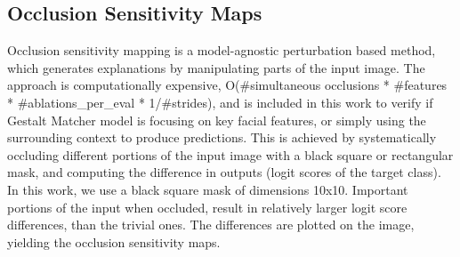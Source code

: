 \documentclass[../report.tex]{subfiles}
\begin{document}
    \subsection{Occlusion Sensitivity Maps}
    Occlusion sensitivity mapping \cite{matthew2014visualizing} is a model-agnostic perturbation based method, which generates explanations by manipulating parts of the input image. The approach is computationally expensive, O(\#simultaneous occlusions * \#features * \#ablations\_per\_eval * 1/\#strides), and is included in this work to verify if Gestalt Matcher model is focusing on key facial features, or simply using the surrounding context to produce predictions. This is achieved by systematically occluding different portions of the input image with a black square or rectangular mask, and computing the difference in outputs (logit scores of the target class). In this work, we use a  black square mask of dimensions 10x10. Important portions of the input when occluded, result in relatively larger logit score differences, than the trivial ones. The differences are plotted on the image, yielding the occlusion sensitivity maps.
    
\end{document}
